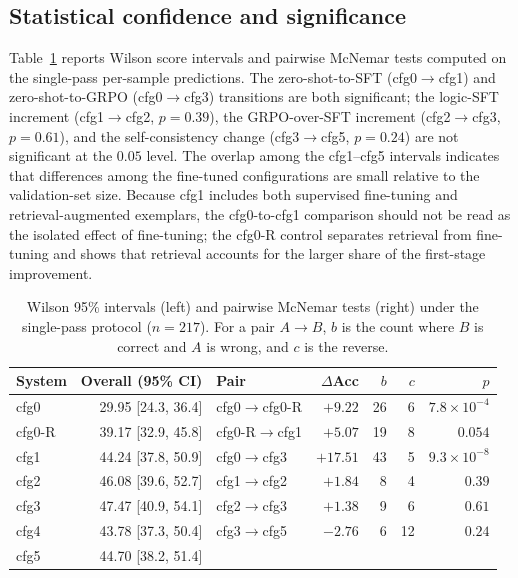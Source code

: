 \documentclass[APA,twocolumn]{USG}
\begin{document}
\subsection{Statistical confidence and significance}
Table~\ref{tab4} reports Wilson score intervals and pairwise McNemar tests
computed on the single-pass per-sample predictions. The zero-shot-to-SFT
(cfg0$\rightarrow$cfg1) and zero-shot-to-GRPO (cfg0$\rightarrow$cfg3)
transitions are both significant; the logic-SFT increment
(cfg1$\rightarrow$cfg2, $p=0.39$), the GRPO-over-SFT increment
(cfg2$\rightarrow$cfg3, $p=0.61$), and the self-consistency change
(cfg3$\rightarrow$cfg5, $p=0.24$) are not significant at the $0.05$ level. The
overlap among the cfg1--cfg5 intervals indicates that differences among the
fine-tuned configurations are small relative to the validation-set size. Because
cfg1 includes both supervised fine-tuning and retrieval-augmented exemplars, the
cfg0-to-cfg1 comparison should not be read as the isolated effect of
fine-tuning; the cfg0-R control separates retrieval from fine-tuning and shows
that retrieval accounts for the larger share of the first-stage improvement.

\begin{table}[t]
\centering
\caption{Wilson 95\% intervals (left) and pairwise McNemar tests (right) under
the single-pass protocol ($n=217$). For a pair $A\rightarrow B$, $b$ is the
count where $B$ is correct and $A$ is wrong, and $c$ is the reverse.\label{tab4}}
\begin{tabular*}{\textwidth}{@{\extracolsep\fill}lr@{\hskip 24pt}lrrrr@{\extracolsep\fill}}
\toprule
\textbf{System} & \textbf{Overall (95\% CI)} & \textbf{Pair} & \textbf{$\Delta$Acc} & \textbf{$b$} & \textbf{$c$} & \textbf{$p$} \\
\midrule
cfg0 & 29.95 [24.3, 36.4] & cfg0$\rightarrow$cfg0-R & $+9.22$ & 26 & \hphantom{0}6 & $7.8\times10^{-4}$ \\
cfg0-R & 39.17 [32.9, 45.8] & cfg0-R$\rightarrow$cfg1 & $+5.07$ & 19 & \hphantom{0}8 & $0.054$ \\
cfg1 & 44.24 [37.8, 50.9] & cfg0$\rightarrow$cfg3 & $+17.51$ & 43 & \hphantom{0}5 & $9.3\times10^{-8}$ \\
cfg2 & 46.08 [39.6, 52.7] & cfg1$\rightarrow$cfg2 & $+1.84$ & \hphantom{0}8 & \hphantom{0}4 & $0.39$ \\
cfg3 & 47.47 [40.9, 54.1] & cfg2$\rightarrow$cfg3 & $+1.38$ & \hphantom{0}9 & \hphantom{0}6 & $0.61$ \\
cfg4 & 43.78 [37.3, 50.4] & cfg3$\rightarrow$cfg5 & $-2.76$ & \hphantom{0}6 & 12 & $0.24$ \\
cfg5 & 44.70 [38.2, 51.4] & & & & & \\
\bottomrule
\end{tabular*}
\end{table}
\end{document}
